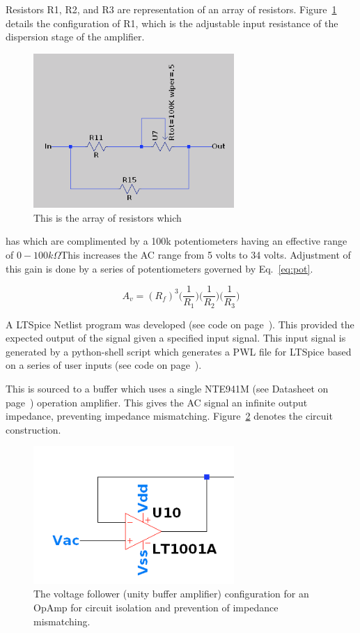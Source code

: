 \documentclass[12pt,journal]{IEEEtran}
\begin{document}
Resistors R1, R2, and R3 are representation of an array of resistors. Figure~\ref{fig:r1-array} details the configuration of R1, which is the adjustable input resistance of the dispersion stage of the amplifier.

\begin{figure}[h!]
  \centering
	\includegraphics[width=3in]{./ltspice/adjustable-resistor-array.png}
	\caption[Cavity Mounts]{This is the array of resistors which}
	\label{fig:r1-array}
\end{figure}

has  which are complimented by a 100k potentiometers having an effective range of $0-100k\Omega$This increases the AC range from 5 volts to 34 volts. Adjustment of this gain is done by a series of potentiometers governed by Eq.~\ref{eq:pot}.

\begin{equation}
A_v = (R_f)^3\Big(\frac{1}{R_1}\Big)\Big(\frac{1}{R_2}\Big)\Big(\frac{1}{R_3}\Big)
\label{eq:pot}
\end{equation}

A LTSpice Netlist program was developed (see code on page~\pageref{code:ltspice-driver}). This provided the expected output of the signal given a specified input signal. This input signal is generated by a python-shell script which generates a PWL file for LTSpice based on a series of user inputs (see code on page~\pageref{code:pwl-ltspice-python}).

This is sourced to a buffer which uses a single NTE941M (see Datasheet on page~\pageref{datasheet:nte941m}) operation amplifier. This gives the AC signal an infinite output impedance, preventing impedance mismatching. Figure~\ref{fig:buffer} denotes the circuit construction.

\begin{figure}[h!]
  \centering
	\includegraphics[width=3in]{./ltspice/unity-buffer-ltspice.png}
	\caption[Cavity Mounts]{The voltage follower (unity buffer amplifier) configuration for an OpAmp for circuit isolation and prevention of impedance mismatching.}
	\label{fig:buffer}
\end{figure}  
\end{document}
